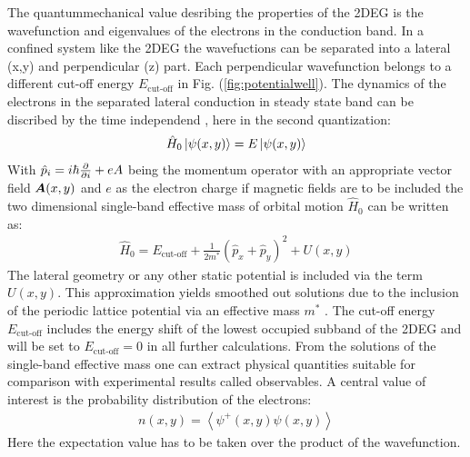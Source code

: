 The quantummechanical value desribing the properties of the 2DEG is the wavefunction and eigenvalues of the electrons in the conduction band. In a confined system like the 2DEG the wavefuctions can be separated into a lateral (x,y) and perpendicular (z) part. Each perpendicular wavefunction belongs to a different cut-off energy $E_{\text{cut-off}}$ in Fig. (\ref{fig:potentialwell}).
The dynamics of the electrons in the separated lateral conduction in steady state band can be discribed by the time independend \sdg{}, here in the second quantization:
\begin{align}
 \hat{H}_0\left| \psi(x,y) \right> = E \left| \psi(x,y) \right>
	\label{eqn:effectivemasssdg}
\end{align}
With $\hat{p}_i = i\hbar \frac{\partial }{\partial i} + eA$ being the momentum operator with an appropriate vector field $\boldsymbol{A}(x,y)$ and $e$ as the electron charge if magnetic fields are to be included the two dimensional single-band effective mass \hamil{} of orbital motion $\hat{H}_0$ can be written as:
\begin{align}
\hat{H}_0 = E_{\text{cut-off}} + \frac{1}{2m^*}(\hat{p}_{x}+\hat{p}_{y})^2+U(x,y)
\end{align}
The lateral geometry or any other static potential is included via the term $U(x,y)$.
This approximation yields smoothed out solutions due to the inclusion of the periodic lattice potential via an effective mass $m^*$ \cite{BastardBrum1986}.
The cut-off energy $E_{\text{cut-off}}$ includes the energy shift of the lowest occupied subband of the 2DEG and will be set to $E_{\text{cut-off}} = 0$ in all further calculations.
From the solutions of the single-band effective mass \sdg{} one can extract physical quantities suitable for comparison with experimental results called observables.
A central value of interest is the probability distribution of the electrons:
\begin{align}
	n(x,y) = \left< \psi^+ (x,y) \psi(x,y)\right>
\end{align}
Here the expectation value has to be taken over the product of the wavefunction.
